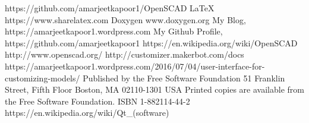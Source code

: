 \documentclass[12pt]{report}
\begin{document}
\begin{thebibliography}{22}
	\bibitem{}  https://github.com/amarjeetkapoor1/OpenSCAD
	\bibitem{} \LaTeX{} https://www.sharelatex.com
	\bibitem{} Doxygen www.doxygen.org
	\bibitem{} My Blog, https://amarjeetkapoor1.wordpress.com
	\bibitem{} My Github Profile, https://github.com/amarjeetkapoor1
	\bibitem{} https://en.wikipedia.org/wiki/OpenSCAD
	\bibitem{} http://www.openscad.org/
	\bibitem{} http://customizer.makerbot.com/docs
	\bibitem{} https://amarjeetkapoor1.wordpress.com/2016/07/04/user-interface-for-customizing-models/
	\bibitem{}
	Published by the Free Software Foundation
	51 Franklin Street, Fifth Floor
	Boston, MA 02110-1301 USA
	Printed copies are available from the Free Software Foundation.
	ISBN 1-882114-44-2
	\bibitem{} https://en.wikipedia.org/wiki/Qt\_(software)

\end{thebibliography}
\end{document}
